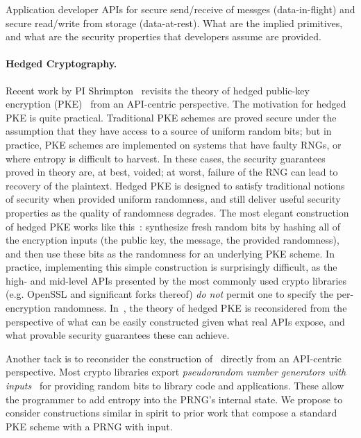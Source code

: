 \begin{task}
\end{task}
%

\begin{task}
Application developer APIs for secure send/receive of messges
(data-in-flight) and secure read/write from storage (data-at-rest).  What are
the implied primitives, and what are the security properties that developers
assume are provided.
\end{task}

\paragraph{Hedged Cryptography. }
Recent work by PI Shrimpton~\cite{BPS} revisits the theory of
hedged public-key encryption (PKE)~\cite{BBN+} from an API-centric perspective.
%
The motivation for hedged PKE is quite practical. Traditional
PKE schemes are proved secure under the assumption that they have access to a
source of uniform random bits; but in practice, PKE schemes are implemented on
systems that have faulty RNGs, or where entropy is difficult to harvest.  In
these cases, the security guarantees proved in theory are, at best, voided; at
worst, failure of the RNG can lead to recovery of the plaintext.
%
Hedged PKE is designed to satisfy traditional notions of security when provided
uniform randomness, and still deliver useful security properties as the quality
of randomness degrades.  The most elegant construction of hedged PKE works like
this~\cite{BBN+,BH15}: synthesize fresh random bits by hashing all of the
encryption inputs (the public key, the message, the provided randomness), and
then use these bits as the randomness for an underlying PKE scheme.  In
practice, implementing this simple construction is surprisingly difficult, as
the high- and mid-level APIs presented by the most commonly used crypto
libraries (e.g. OpenSSL and significant forks thereof) \emph{do not} permit one
to specify the per-encryption randomness. In~\cite{BPS}, the theory of hedged
PKE is reconsidered from the perspective of what can be easily constructed given
what real APIs expose, and what provable security guarantees these can achieve.

\begin{task}
  Another tack is to reconsider the construction of~\cite{BBN+,BH15} directly
  from an API-centric perspective.
  Most crypto libraries export \emph{pseudorandom number generators with
  inputs}~\cite{BH05,ST15} for providing random bits to library code and
  applications. These allow the programmer to add entropy into the PRNG's
  internal state.
  We propose to consider constructions similar in spirit to prior work
  that compose a standard PKE scheme with a PRNG with input.
\end{task}

